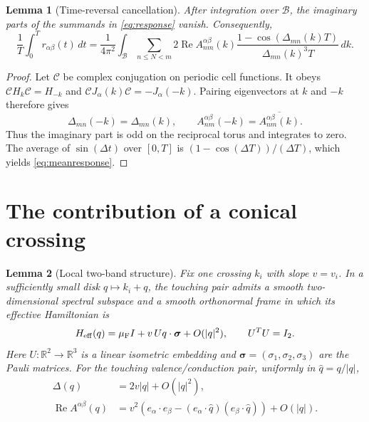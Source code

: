 \documentclass[11pt,a4paper]{article}
\DeclareMathOperator{\RePart}{Re}
\newcommand{\R}{\mathbb R}
\newcommand{\BZ}{\mathcal B}
\newtheorem{lemma}{Lemma}
\begin{document}
\begin{lemma}[Time-reversal cancellation]\label{lem:TR}
After integration over $\BZ$, the imaginary parts of the summands in
\eqref{eq:response} vanish. Consequently,
\begin{equation}\label{eq:meanresponse}
 \frac1T\int_0^T r_{\alpha\beta}(t)\,dt
 =\frac1{4\pi^2}\int_\BZ\sum_{n\leq N<m}
 2\RePart A_{nm}^{\alpha\beta}(k)
 \frac{1-\cos(\Delta_{mn}(k)T)}{\Delta_{mn}(k)^3T}\,dk.
\end{equation}
\end{lemma}

\begin{proof}
Let $\mathcal C$ be complex conjugation on periodic cell functions. It obeys
$\mathcal C H_k\mathcal C=H_{-k}$ and
$\mathcal C J_\alpha(k)\mathcal C=-J_\alpha(-k)$. Pairing eigenvectors at
$k$ and $-k$ therefore gives
\[
 \Delta_{mn}(-k)=\Delta_{mn}(k),\qquad
 A_{nm}^{\alpha\beta}(-k)
 =\overline{A_{nm}^{\alpha\beta}(k)}.
\]
Thus the imaginary part is odd on the reciprocal torus and integrates to zero.
The average of $\sin(\Delta t)$ over $[0,T]$ is
$(1-\cos(\Delta T))/(\Delta T)$, which yields
\eqref{eq:meanresponse}.
\end{proof}

\section{The contribution of a conical crossing}

\begin{lemma}[Local two-band structure]\label{lem:local}
Fix one crossing $k_i$ with slope $v=v_i$. In a sufficiently small disk
$q\mapsto k_i+q$, the touching pair admits a smooth two-dimensional spectral
subspace and a smooth orthonormal frame in which its effective Hamiltonian is
\[
 H_{\rm eff}(q)=\mu_{\rm F}I+v\,Uq\cdot\boldsymbol\sigma+O(|q|^2),
 \qquad U^TU=I_2.
\]
Here $U:\R^2\to\R^3$ is a linear isometric embedding and
$\boldsymbol\sigma=(\sigma_1,\sigma_2,\sigma_3)$ are the Pauli matrices.
For the touching valence/conduction pair, uniformly in $\widehat q=q/|q|$,
\begin{align}
 \Delta(q)&=2v|q|+O(|q|^2),\label{eq:gaplocal}\\
 \RePart A^{\alpha\beta}(q)
 &=v^2\left(e_\alpha\cdot e_\beta
 -(e_\alpha\cdot\widehat q)(e_\beta\cdot\widehat q)\right)
 +O(|q|).\label{eq:Alocal}
\end{align}
\end{lemma}
\end{document}
